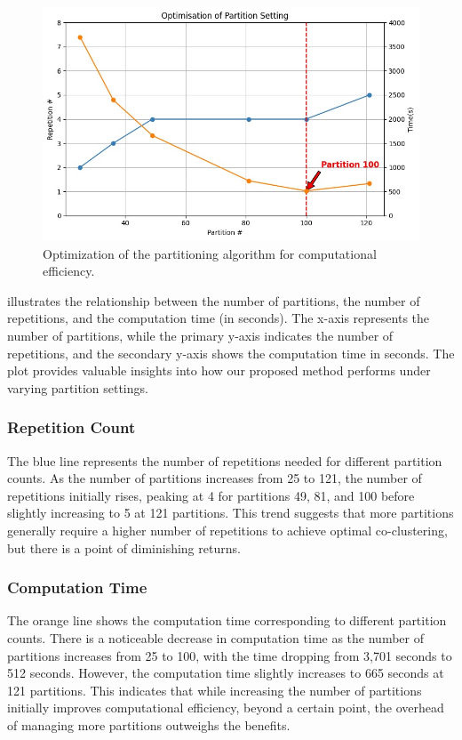 \documentclass[journal]{IEEEtran}
\begin{document}
\begin{figure}[htbp]
    \centering
    \includegraphics[width=0.8\linewidth]{optimisation.jpg}
    \caption{Optimization of the partitioning algorithm for computational efficiency.}
    \label{fig:optimisation}
\end{figure}

 illustrates the relationship between the number of partitions, the number of repetitions, and the computation time (in seconds). The x-axis represents the number of partitions, while the primary y-axis indicates the number of repetitions, and the secondary y-axis shows the computation time in seconds. The plot provides valuable insights into how our proposed method performs under varying partition settings.

\subsubsection{Repetition Count}
The blue line represents the number of repetitions needed for different partition counts. As the number of partitions increases from 25 to 121, the number of repetitions initially rises, peaking at 4 for partitions 49, 81, and 100 before slightly increasing to 5 at 121 partitions. This trend suggests that more partitions generally require a higher number of repetitions to achieve optimal co-clustering, but there is a point of diminishing returns.

\subsubsection{Computation Time}
The orange line shows the computation time corresponding to different partition counts. There is a noticeable decrease in computation time as the number of partitions increases from 25 to 100, with the time dropping from 3,701 seconds to 512 seconds. However, the computation time slightly increases to 665 seconds at 121 partitions. This indicates that while increasing the number of partitions initially improves computational efficiency, beyond a certain point, the overhead of managing more partitions outweighs the benefits.
\end{document}
